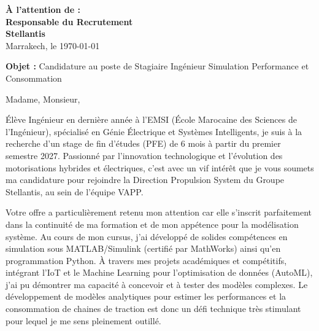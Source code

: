 \documentclass[10pt,a4paper]{altacv}
\makeatletter
\renewcommand{\makecvheader}{%
  \begingroup
    \raggedright\color{emphasis}%
    {\Huge\bfseries\MakeUppercase{\@name}\par}
    \medskip
    {\large\bfseries\color{accent}\@tagline\par}
    \medskip
    {\footnotesize\bfseries\@personalinfo\par}
  \endgroup\medskip
}
\makeatother
\begin{document}

\makecvheader

\bigskip

\begin{flushright}
  {\color{emphasis}\textbf{À l'attention de :}} \\[2pt]
  \textbf{Responsable du Recrutement} \\
  \textbf{Stellantis} \\[20pt]
  Marrakech, le \today
\end{flushright}
\bigskip

\bigskip

{\color{accent}\textbf{Objet :}} Candidature au poste de Stagiaire Ingénieur Simulation Performance et Consommation

\bigskip\bigskip

Madame, Monsieur,

\vspace{0.4cm}

Élève Ingénieur en dernière année à l'EMSI (École Marocaine des Sciences de l'Ingénieur), spécialisé en Génie Électrique et Systèmes Intelligents, je suis à la recherche d'un stage de fin d'études (PFE) de 6 mois à partir du premier semestre 2027. Passionné par l'innovation technologique et l'évolution des motorisations hybrides et électriques, c'est avec un vif intérêt que je vous soumets ma candidature pour rejoindre la Direction Propulsion System du Groupe Stellantis, au sein de l'équipe VAPP.

\vspace{0.4cm}

Votre offre a particulièrement retenu mon attention car elle s'inscrit parfaitement dans la continuité de ma formation et de mon appétence pour la modélisation système. Au cours de mon cursus, j'ai développé de solides compétences en simulation sous MATLAB/Simulink (certifié par MathWorks) ainsi qu'en programmation Python. À travers mes projets académiques et compétitifs, intégrant l'IoT et le Machine Learning pour l'optimisation de données (AutoML), j'ai pu démontrer ma capacité à concevoir et à tester des modèles complexes. Le développement de modèles analytiques pour estimer les performances et la consommation de chaines de traction est donc un défi technique très stimulant pour lequel je me sens pleinement outillé.
\end{document}
